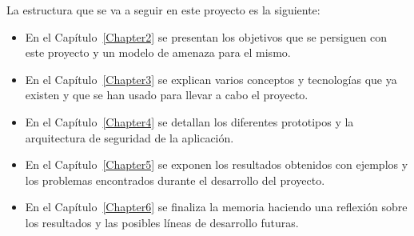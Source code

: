 La estructura que se va a seguir en este proyecto es la siguiente:

\begin{itemize}
  \item En el Capítulo~\ref{Chapter2} se presentan los objetivos que se persiguen con este proyecto y un modelo de amenaza para el mismo.
  \item En el Capítulo~\ref{Chapter3} se explican varios conceptos y tecnologías que ya existen y que se han usado para llevar a cabo el proyecto.
  \item En el Capítulo~\ref{Chapter4} se detallan los diferentes prototipos y la arquitectura de seguridad de la aplicación.
  \item En el Capítulo~\ref{Chapter5} se exponen los resultados obtenidos con ejemplos y los problemas encontrados durante el desarrollo del proyecto.
  \item En el Capítulo~\ref{Chapter6} se finaliza la memoria haciendo una reflexión sobre los resultados y las posibles líneas de desarrollo futuras.
\end{itemize}
